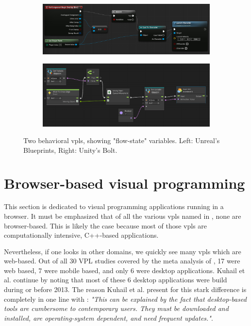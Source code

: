 \begin{figure}
\centering
\begin{subfigure}[b]{0.45\linewidth}
  \graphicspath{{../../assets/images/background/geo-vpl/}}
  \centering
  \includegraphics[width=\linewidth]{unreal-blueprints.jpg}
  \caption{}\label{fig:logic-vpl:1}
\end{subfigure}%
\qquad %
\begin{subfigure}[b]{0.45\linewidth}
  \graphicspath{{../../assets/images/background/geo-vpl/}}
  \centering
  \includegraphics[width=\linewidth]{unity-bolt-2.png}
  \caption{}\label{fig:logic-vpl:2}
\end{subfigure}%
\caption[Behavioral VPLs]{Two behavioral vpls, showing "flow-state" variables. Left: Unreal's Blueprints, Right: Unity's Bolt.}
\label{fig:logic-vpl}
\end{figure}

\section{Browser-based visual programming}
\label{sec:related-webvpl}

This section is dedicated to visual programming applications running in a browser.
It must be emphasized that of all the various vpls named in , none are browser-based. 
This is likely the case because most of those vpls are computationally intensive, C++-based applications.

Nevertheless, if one looks in other domains, we quickly see many \ac{vpl}s which are web-based. 
Out of all 30 VPL studies covered by the meta analysis of \cite{kuhail_characterizing_2021}, 17 were web based, 7 were mobile based, and only 6 were desktop applications. 
Kuhail et al. continue by noting that most of these 6 desktop applications were build during or before 2013. 
The reason Kuhail et al. present for this stark difference is completely in one line with : 
\emph{"This can be explained by the fact that desktop-based tools are cumbersome to contemporary users. They must be downloaded and installed, are operating-system dependent, and need frequent updates."}.

